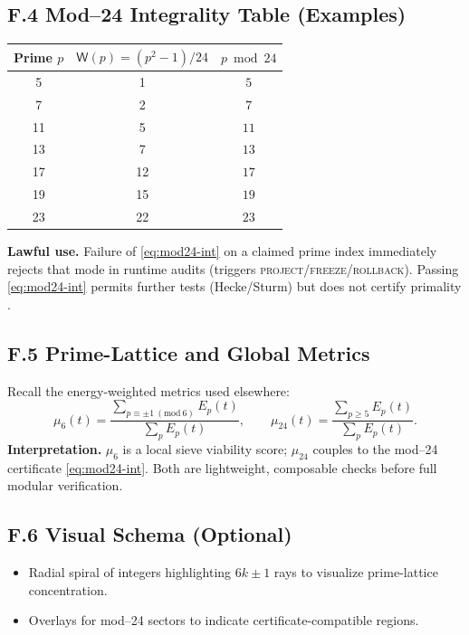 \documentclass[12pt]{amsart}
\theoremstyle{plain}
\begin{document}
\subsection*{F.4 Mod–24 Integrality Table (Examples)}
\begin{center}
\begin{tabular}{c|c|c}
Prime $p$ & $\mathsf{W}(p)=(p^{2}-1)/24$ & $p\bmod 24$ \\
\hline
5  & 1  & $5$ \\
7  & 2  & $7$ \\
11 & 5  & $11$ \\
13 & 7  & $13$ \\
17 & 12 & $17$ \\
19 & 15 & $19$ \\
23 & 22 & $23$ \\
\end{tabular}
\end{center}
\noindent
\textbf{Lawful use.} Failure of \eqref{eq:mod24-int} on a claimed prime index immediately rejects that mode in runtime audits (triggers \textsc{project}/\textsc{freeze}/\textsc{rollback}). Passing \eqref{eq:mod24-int} permits further tests (Hecke/Sturm) but does not certify primality \cite{sturm1987congruence,diamond2005first}.

\subsection*{F.5 Prime-Lattice and Global Metrics}
Recall the energy-weighted metrics used elsewhere:
\[
\mu_6(t)=\frac{\sum_{p\equiv\pm1\ (\mathrm{mod}\ 6)}E_p(t)}{\sum_{p}E_p(t)},
\qquad
\mu_{24}(t)=\frac{\sum_{p\ge5}E_p(t)}{\sum_{p}E_p(t)}.
\]
\noindent
\textbf{Interpretation.} $\mu_6$ is a local sieve viability score; $\mu_{24}$ couples to the mod–24 certificate \eqref{eq:mod24-int}. Both are lightweight, composable checks before full modular verification.

\subsection*{F.6 Visual Schema (Optional)}
\begin{itemize}
  \item Radial spiral of integers highlighting $6k\pm1$ rays to visualize prime-lattice concentration.
  \item Overlays for mod–24 sectors to indicate certificate-compatible regions.
\end{itemize}
\end{document}
